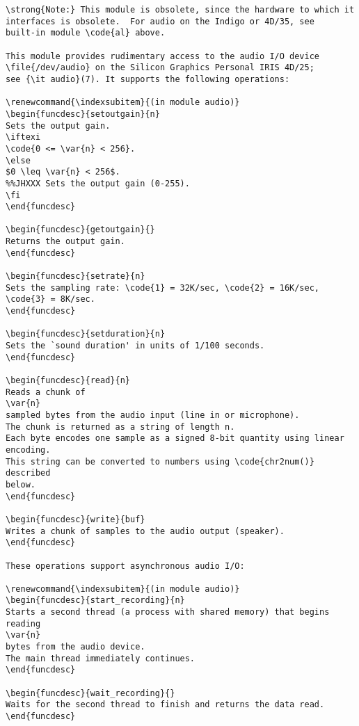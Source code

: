 \begin{verbatim}
\strong{Note:} This module is obsolete, since the hardware to which it
interfaces is obsolete.  For audio on the Indigo or 4D/35, see
built-in module \code{al} above.

This module provides rudimentary access to the audio I/O device
\file{/dev/audio} on the Silicon Graphics Personal IRIS 4D/25;
see {\it audio}(7). It supports the following operations:

\renewcommand{\indexsubitem}{(in module audio)}
\begin{funcdesc}{setoutgain}{n}
Sets the output gain.
\iftexi
\code{0 <= \var{n} < 256}.
\else
$0 \leq \var{n} < 256$.
%%JHXXX Sets the output gain (0-255).
\fi
\end{funcdesc}

\begin{funcdesc}{getoutgain}{}
Returns the output gain.
\end{funcdesc}

\begin{funcdesc}{setrate}{n}
Sets the sampling rate: \code{1} = 32K/sec, \code{2} = 16K/sec,
\code{3} = 8K/sec.
\end{funcdesc}

\begin{funcdesc}{setduration}{n}
Sets the `sound duration' in units of 1/100 seconds.
\end{funcdesc}

\begin{funcdesc}{read}{n}
Reads a chunk of
\var{n}
sampled bytes from the audio input (line in or microphone).
The chunk is returned as a string of length n.
Each byte encodes one sample as a signed 8-bit quantity using linear
encoding.
This string can be converted to numbers using \code{chr2num()} described
below.
\end{funcdesc}

\begin{funcdesc}{write}{buf}
Writes a chunk of samples to the audio output (speaker).
\end{funcdesc}

These operations support asynchronous audio I/O:

\renewcommand{\indexsubitem}{(in module audio)}
\begin{funcdesc}{start_recording}{n}
Starts a second thread (a process with shared memory) that begins reading
\var{n}
bytes from the audio device.
The main thread immediately continues.
\end{funcdesc}

\begin{funcdesc}{wait_recording}{}
Waits for the second thread to finish and returns the data read.
\end{funcdesc}


\end{verbatim}
